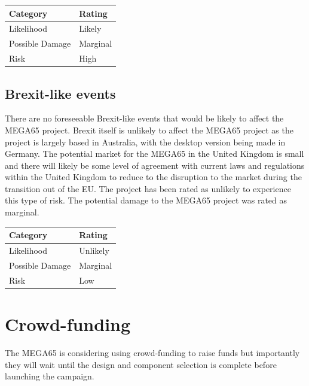 \begin{tabular}{l|l} %
    	\textbf{Category} 	&	\textbf{Rating} \\
      \hline
     Likelihood			&	Likely \\
     Possible Damage 	& 	Marginal \\
     Risk 				&	High		\\	
    \end{tabular}


\subsection{Brexit-like events}
There are no foreseeable Brexit-like events that would be likely to affect the MEGA65 project. Brexit itself is unlikely to affect the MEGA65 project as the project is largely based in Australia, with the desktop version being made in Germany. The potential market for the MEGA65 in the United Kingdom is small and there will likely be some level of agreement with current laws and regulations within the United Kingdom to reduce to the disruption to the market during the transition out of the EU. The project has been rated as unlikely to experience this type of risk. The potential damage to the MEGA65 project was rated as marginal. \\

\begin{tabular}{l|l} %
    	\textbf{Category} 	&	\textbf{Rating} \\
      \hline
     Likelihood			&	Unlikely \\
     Possible Damage 	& 	Marginal \\
     Risk 				&	Low		\\	
    \end{tabular}


\section{Crowd-funding}
The MEGA65 is considering using crowd-funding to raise funds but importantly they will wait until the design and component selection is complete before launching the campaign.

